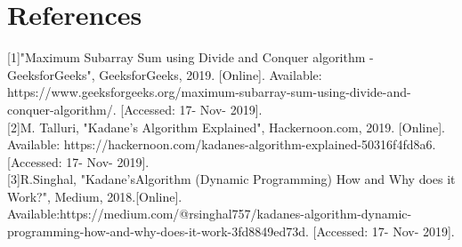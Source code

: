 \documentclass[twocolumns]{IEEEtran}
\begin{document}
\section{References}

[1]"Maximum Subarray Sum using Divide and Conquer algorithm - GeeksforGeeks", GeeksforGeeks, 2019. [Online]. Available: https://www.geeksforgeeks.org/maximum-subarray-sum-using-divide-and-conquer-algorithm/. [Accessed: 17- Nov- 2019].\\

[2]M. Talluri, "Kadane’s Algorithm Explained", Hackernoon.com, 2019. [Online]. Available: https://hackernoon.com/kadanes-algorithm-explained-50316f4fd8a6. [Accessed: 17- Nov- 2019].\\

[3]R.Singhal, "Kadane’sAlgorithm (Dynamic Programming) How and Why does it Work?", Medium, 2018.[Online]. Available:https://medium.com/@rsinghal757/kadanes-algorithm-dynamic-programming-how-and-why-does-it-work-3fd8849ed73d. [Accessed: 17- Nov- 2019].
\end{document}
